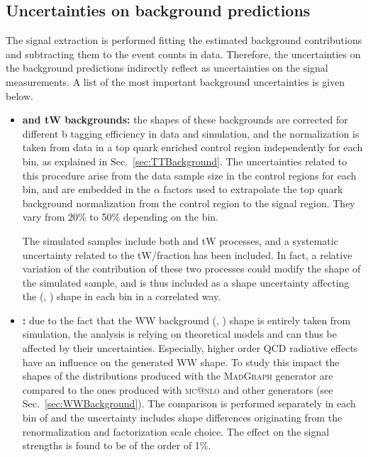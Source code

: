 \subsection{Uncertainties on background predictions}

The signal extraction is performed fitting the estimated background contributions and subtracting them to the event counts in data. Therefore, the uncertainties on the background predictions indirectly reflect as uncertainties on the signal measurements. A list of the most important background uncertainties is given below.

\begin{itemize}
\item {\bf\boldmath \ttbar and tW backgrounds:}    
the shapes of these backgrounds are corrected for different b tagging efficiency in data and simulation, and the normalization is taken from data in a top quark enriched control region independently for each \pth bin, as explained in Sec.~\ref{sec:TTBackground}. The uncertainties related to this procedure arise from the data sample size in the control regions for each \pth bin, and are embedded in the $\alpha$ factors used to extrapolate the top quark background normalization from the control region to the signal region. They vary from 20\% to 50\% depending on the \pth bin.
   
The simulated samples include both \ttbar and tW processes, and a systematic uncertainty related to the tW$/$\ttbar fraction has been included.
In fact, a relative variation of the contribution of these two processes could modify the shape of the simulated sample, and is thus included as a shape uncertainty affecting the (\mll, \mt) shape in each \pth bin in a correlated way. 

\item {\bf {}:} 
due to the fact that the WW background (\mll, \mt) shape is entirely taken from simulation, the analysis is relying on theoretical models and can thus be affected by their uncertainties. Especially, higher order QCD radiative effects have an influence on the generated WW shape. To study this impact the shapes of the distributions produced with the \textsc{MadGraph} generator are compared to the ones produced with \textsc{mc@nlo} and other generators (see Sec.~\ref{sec:WWBackground}). The comparison is performed separately in each bin of \pth and the uncertainty includes shape differences originating from the renormalization and factorization scale choice. The effect on the signal strengths is found to be of the order of 1\%.
  

\end{itemize}
